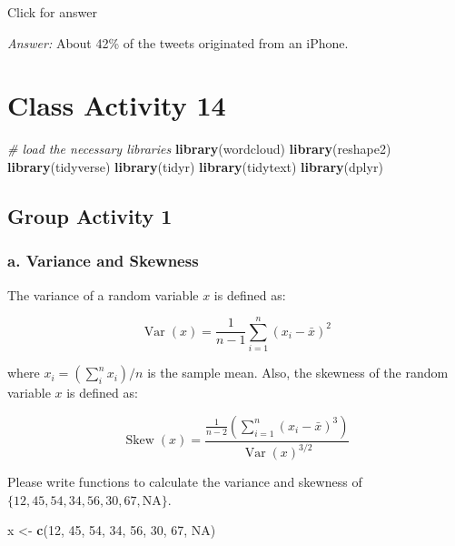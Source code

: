 \documentclass[
]{book}
\newenvironment{Shaded}{\begin{snugshade}}{\end{snugshade}}
\newcommand{\CommentTok}[1]{\textcolor[rgb]{0.56,0.35,0.01}{\textit{#1}}}
\newcommand{\ConstantTok}[1]{\textcolor[rgb]{0.56,0.35,0.01}{#1}}
\newcommand{\DecValTok}[1]{\textcolor[rgb]{0.00,0.00,0.81}{#1}}
\newcommand{\FunctionTok}[1]{\textcolor[rgb]{0.13,0.29,0.53}{\textbf{#1}}}
\newcommand{\NormalTok}[1]{#1}
\newcommand{\OtherTok}[1]{\textcolor[rgb]{0.56,0.35,0.01}{#1}}
\begin{document}
Click for answer

\emph{Answer:} About 42\% of the tweets originated from an iPhone.

\hypertarget{class-activity-14}{%
\chapter{Class Activity 14}\label{class-activity-14}}

\begin{Shaded}
\begin{Highlighting}[]
\CommentTok{\# load the necessary libraries}
\FunctionTok{library}\NormalTok{(wordcloud)}
\FunctionTok{library}\NormalTok{(reshape2)}
\FunctionTok{library}\NormalTok{(tidyverse)}
\FunctionTok{library}\NormalTok{(tidyr)}
\FunctionTok{library}\NormalTok{(tidytext)}
\FunctionTok{library}\NormalTok{(dplyr)}
\end{Highlighting}
\end{Shaded}

\hypertarget{group-activity-1-1}{%
\section{Group Activity 1}\label{group-activity-1-1}}

\hypertarget{a.-variance-and-skewness}{%
\subsection{a. Variance and Skewness}\label{a.-variance-and-skewness}}

The variance of a random variable \(x\) is defined as:

\[\operatorname{Var}(x)=\frac{1}{n-1} \sum_{i=1}^{n}\left(x_{i}-\bar{x}\right)^{2}\]

where \(x_i = (\sum_i^n x_i)/n\) is the sample mean. Also, the skewness of the random variable \(x\) is defined as:

\[\operatorname{Skew}(x)=\frac{\frac{1}{n-2}\left(\sum_{i=1}^{n}\left(x_{i}-\bar{x}\right)^{3}\right)}{\operatorname{Var}(x)^{3 /2}}\]

Please write functions to calculate the variance and skewness of \(\{12, 45, 54, 34, 56, 30, 67, \text{NA}\}\).

\begin{Shaded}
\begin{Highlighting}[]
\NormalTok{x }\OtherTok{\textless{}{-}} \FunctionTok{c}\NormalTok{(}\DecValTok{12}\NormalTok{, }\DecValTok{45}\NormalTok{, }\DecValTok{54}\NormalTok{, }\DecValTok{34}\NormalTok{, }\DecValTok{56}\NormalTok{, }\DecValTok{30}\NormalTok{, }\DecValTok{67}\NormalTok{, }\ConstantTok{NA}\NormalTok{)}
\end{Highlighting}
\end{Shaded}
\end{document}
